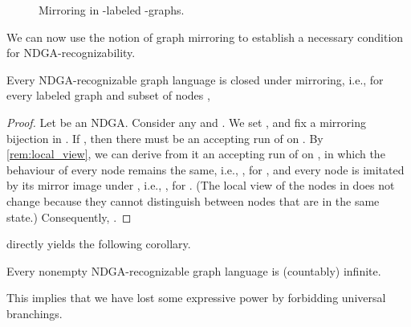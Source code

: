 \documentclass[a4paper,11pt,twoside]{report} \pdfoutput=1
\begin{document}
\begin{figure}
\begin{subfigure}{0.51\textwidth}
     \vspace{.5ex}
    \caption{\;}
    \label{fig:graph_2_after_mirroring}
  \end{subfigure}
  \caption{Mirroring in -labeled -graphs.}
\end{figure}

We can now use the notion of graph mirroring to establish a necessary
condition for NDGA-recognizability.

\begin{lemma} \label{lem:weak-mirroring}
  Every NDGA-recognizable graph language  is closed under
  mirroring, i.e., for every labeled graph  and subset of nodes
  ,
  
\end{lemma}

\begin{proof}
  Let  be an NDGA. Consider any
   and . We set , and
  fix a mirroring bijection  in
  . If , then there must be an accepting run
   of  on . By
  \cref{rem:local_view}, we can derive from it an accepting run
   of  on , in which the
  behaviour of every node  remains the same, i.e.,
  , for , and every node  is imitated by
  its mirror image under , i.e., , for
  . (The local view of the nodes in  does not
  change because they cannot distinguish between nodes that are in the
  same state.) Consequently, .
\end{proof}

 directly yields the following corollary.

\begin{corollary} \label{cor:ndga_infinite}
  Every nonempty NDGA-recognizable graph language is (countably)
  infinite.
\end{corollary}

This implies that we have lost some expressive power by forbidding
universal branchings.
\end{document}
